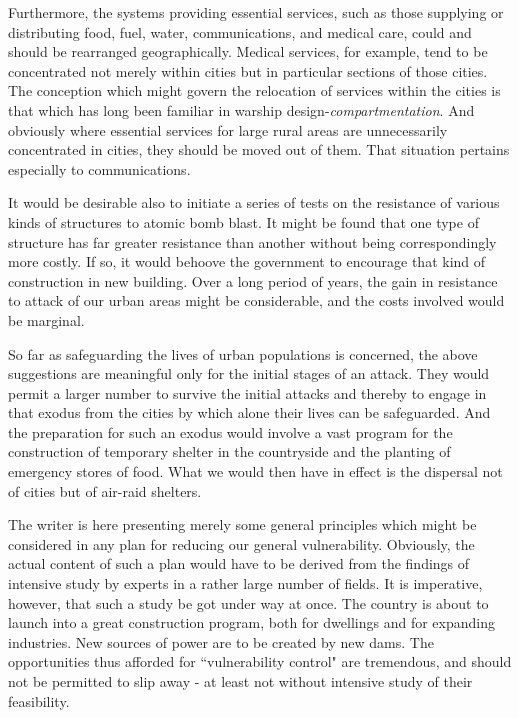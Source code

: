 Furthermore, the systems providing essential services, such as those supplying or distributing food, fuel, water, communications, and medical care, could and should be rearranged geographically. Medical services, for example, tend to be concentrated not merely within cities but in particular sections of those cities. The conception which might govern the relocation of services within the cities is that which has long been familiar in warship design-\emph{compartmentation}. And obviously where essential services for large rural areas are unnecessarily concentrated in cities, they should be moved out of them. That situation pertains especially to communications.

It would be desirable also to initiate a series of tests on the resistance of various kinds of structures to atomic bomb blast. It might be found that one type of structure has far greater resistance than another without being correspondingly more costly. If so, it would behoove the government to encourage that kind of construction in new building. Over a long period of years, the gain in resistance to attack of our urban areas might be considerable, and the costs involved would be marginal.

So far as safeguarding the lives of urban populations is concerned, the above suggestions are meaningful only for the initial stages of an attack. They would permit a larger number to survive the initial attacks and thereby to engage in that exodus from the cities by which alone their lives can be safeguarded. And the preparation for such an exodus would involve a vast program for the construction of temporary shelter in the countryside and the planting of emergency stores of food. What we would then have in effect is the dispersal not of cities but of air-raid shelters.

The writer is here presenting merely some general principles which might be
considered in any plan for reducing our general vulnerability. Obviously, the
actual content of such a plan would have to be derived from the findings of intensive
study by experts in a rather large number of fields. It is imperative,
however, that such a study be got under way at once. The country is about to
launch into a great construction program, both for dwellings and for expanding
industries. New sources of power are to be created by new dams. The opportunities
thus afforded for ``vulnerability control" are tremendous, and should not be
permitted to slip away - at least not without intensive study of their feasibility.


